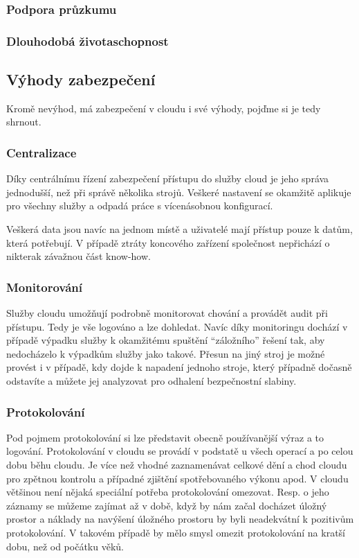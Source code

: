 \subsubsection{Podpora průzkumu}
\subsubsection{Dlouhodobá životaschopnost}

\subsection{Výhody zabezpečení}
Kromě nevýhod, má zabezpečení v cloudu i své výhody, pojďme si je tedy shrnout.

\subsubsection{Centralizace}
Díky centrálnímu řízení zabezpečení přístupu do služby cloud je jeho správa jednodušší, než při správě několika strojů. Veškeré nastavení se okamžitě aplikuje pro všechny služby a odpadá práce s vícenásobnou konfigurací.

Veškerá data jsou navíc na jednom místě a uživatelé mají přístup pouze k datům, která potřebují. V případě ztráty koncového zařízení společnost nepřichází o nikterak závažnou část know-how.

\subsubsection{Monitorování}
Služby cloudu umožňují podrobně monitorovat chování a provádět audit při přístupu. Tedy je vše logováno a lze dohledat. Navíc díky monitoringu dochází v případě výpadku služby k okamžitému spuštění "`záložního"' řešení tak, aby nedocházelo k výpadkům služby jako takové. Přesun na jiný stroj je možné provést i v případě, kdy dojde k napadení jednoho stroje, který případně dočasně odstavíte a můžete jej analyzovat pro odhalení bezpečnostní slabiny.

\subsubsection{Protokolování}
Pod pojmem protokolování si lze představit obecně používanější výraz a to logování. Protokolování v cloudu se provádí v podstatě u všech operací a po celou dobu běhu cloudu. Je více než vhodné zaznamenávat celkové dění a chod cloudu pro zpětnou kontrolu a případné zjištění spotřebovaného výkonu apod. V cloudu většinou není nějaká speciální potřeba protokolování omezovat. Resp. o jeho záznamy se můžeme zajímat až v době, když by nám začal docházet úložný prostor a náklady na navýšení úložného prostoru by byli neadekvátní k pozitivům protokolování. V takovém případě by mělo smysl omezit protokolování na kratší dobu, než od počátku věků.

